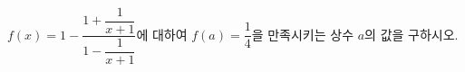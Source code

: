 $f(x)=1-\dfrac{1+\dfrac{1}{x+1}}{1-\dfrac{1}{x+1}}$에 대하여 $f(a)=\dfrac{1}{4}$을 만족시키는 상수 $a$의 값을 구하시오.
